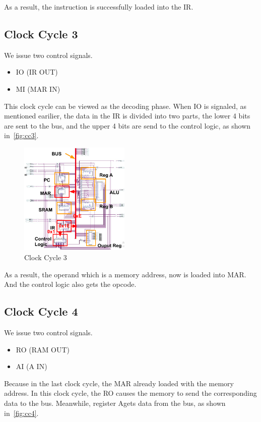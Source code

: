 As a result, the instruction is successfully loaded into the IR.


\subsection{Clock Cycle 3}

We issue two control signals.

\begin{itemize}
	\item IO (IR OUT)
	\item MI (MAR IN)
\end{itemize}

This clock cycle can be viewed as the decoding phase. When IO is signaled, as mentioned earilier, the data in the IR is divided into two parts, the lower 4 bits are sent to the bus, and the upper 4 bits are send to the control logic, as shown in~\autoref{fig:cc3}.


\begin{figure}[th]
	\includegraphics[width=0.47\textwidth]{figures/cc3}
	\centering
	\caption{Clock Cycle 3}
	\label{fig:cc3}
\end{figure}

As a result, the operand which is a memory address, now is loaded into MAR. And the control logic also gets the opcode.


\subsection{Clock Cycle 4}

We issue two control signals.

\begin{itemize}
	\item RO (RAM OUT)
	\item AI (A IN)
\end{itemize}

Because in the last clock cycle, the MAR already loaded with the memory address. In this clock cycle, the RO causes the memory to send the corresponding data to the bus. Meanwhile, register Agets data from the bus, as shown in~\autoref{fig:cc4}.

